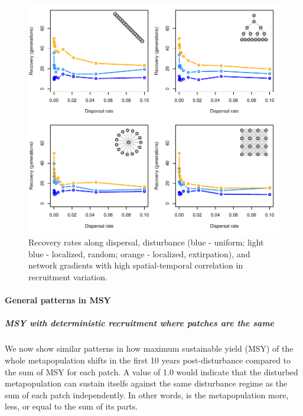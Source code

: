 \documentclass[]{article}
\let\oldparagraph\paragraph
\renewcommand{\paragraph}[1]{\oldparagraph{#1}\mbox{}}
\let\oldsubparagraph\subparagraph
\renewcommand{\subparagraph}[1]{\oldsubparagraph{#1}\mbox{}}
\begin{document}
\begin{figure}[H]

{\centering \includegraphics{Managing_for_ecological_surprises_in_metapopulations_makeHTML_files/figure-latex/spatiotemporal correlation-1} 

}

\caption{Recovery rates along dispersal, disturbance (blue - uniform; light blue - localized, random; orange - localized, extirpation), and network gradients with high spatial-temporal correlation in recruitment variation.}\label{fig:spatiotemporal correlation}
\end{figure}

\paragraph{General patterns in MSY}\label{general-patterns-in-msy}

\subparagraph{MSY with deterministic recruitment where patches are the
same}\label{msy-with-deterministic-recruitment-where-patches-are-the-same}

We now show similar patterns in how maximum sustainable yield (MSY) of
the whole metapopulation shifts in the first 10 years post-disturbance
compared to the sum of MSY for each patch. A value of 1.0 would indicate
that the disturbed metapopulation can sustain itselfs against the same
disturbance regime as the sum of each patch independently. In other
words, is the metapopulation more, less, or equal to the sum of its
parts.
\end{document}
